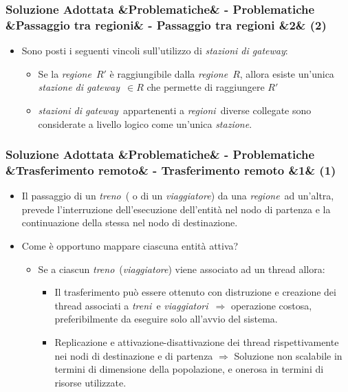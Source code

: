 \documentclass[slidestop,compress,blackandwhite]{beamer}
\newcommand{\ii}[1]{\textit{#1}}
\newcommand{\treno}{\ii{treno}}
\newcommand{\treni}{\ii{treni}}
\newcommand{\viaggiatore}{\ii{viaggiatore}}
\newcommand{\viaggiatori}{\ii{viaggiatori}}
\newcommand{\stazione}{\ii{stazione}}
\newcommand{\regione}{\ii{regione}}
\newcommand{\regioni}{\ii{regioni}}
\newcommand{\gateway}{\ii{stazione di gateway}}
\newcommand{\gateways}{\ii{stazioni di gateway}}
\newcommand{\newtitle}[4]{
	#1 
	\ifx&#2&%
	\else
  		\large- #2
	\fi
	\ifx&#3&%
	\else
  		\normalsize- #3
	\fi
	\ifx&#4&%
	\else
  		\normalsize (#4)
	\fi
}
\newcommand{\newframe}[5]{
	\begin{frame}
		\frametitle{\newtitle{#1}{#2}{#3}{#4}}
		#5
	\end{frame}
}
\newcommand{\myitemize}[1]{\begin{itemize}#1\end{itemize}}
\begin{document}
	\newframe{Soluzione Adottata}{Problematiche}{Passaggio tra regioni}{2}{
		\vspace{0.5cm}
		\myitemize{
			\item Sono posti i seguenti vincoli sull'utilizzo di \gateways:
				\myitemize{
					\item Se la \regione~$R'$ è raggiungibile dalla \regione~$R$, allora esiste un'unica \gateway~$\in R$ che permette di raggiungere $R'$
					\item \gateways~appartenenti a \regioni~diverse collegate sono considerate a livello logico come un'unica \stazione.
				
				}
		}
	}
	
	
	\newframe{Soluzione Adottata}{Problematiche}{Trasferimento remoto}{1}{
		\myitemize{
			\item Il passaggio di un \treno~( o di un \viaggiatore) da una \regione~ad un'altra, prevede l'interruzione dell'esecuzione dell'entità nel nodo di partenza e la continuazione della stessa nel nodo di destinazione.
			\item Come è opportuno mappare ciascuna entità attiva?
				\myitemize{
					\item Se a ciascun \treno~(\viaggiatore) viene associato ad un thread allora:
						\myitemize{
							\item Il trasferimento può essere ottenuto con distruzione e creazione dei thread associati a \treni~e \viaggiatori~$\Rightarrow$ operazione costosa, preferibilmente da eseguire solo all'avvio del sistema.
							\item Replicazione e attivazione-disattivazione dei thread rispettivamente nei nodi di destinazione e di partenza $\Rightarrow$ Soluzione non scalabile in termini di dimensione della popolazione, e onerosa in termini di risorse utilizzate. 
						} 
				}
		}
	}
	
\end{document}
